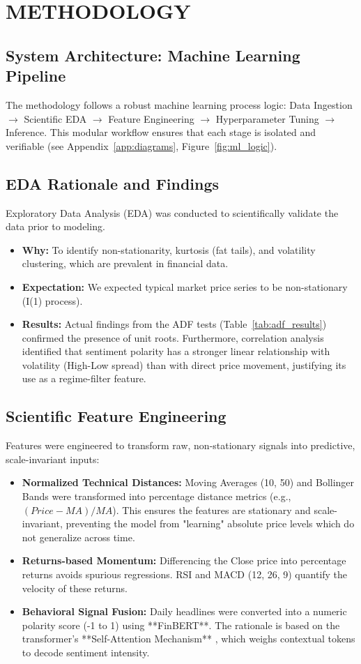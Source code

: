 \chapter{METHODOLOGY}

\section{System Architecture: Machine Learning Pipeline}
The methodology follows a robust machine learning process logic: Data Ingestion $\rightarrow$ Scientific EDA $\rightarrow$ Feature Engineering $\rightarrow$ Hyperparameter Tuning $\rightarrow$ Inference. This modular workflow ensures that each stage is isolated and verifiable (see Appendix~\ref{app:diagrams}, Figure~\ref{fig:ml_logic}).

\section{EDA Rationale and Findings}
Exploratory Data Analysis (EDA) was conducted to scientifically validate the data prior to modeling.
\begin{itemize}
    \item \textbf{Why:} To identify non-stationarity, kurtosis (fat tails), and volatility clustering, which are prevalent in financial data.
    \item \textbf{Expectation:} We expected typical market price series to be non-stationary (I(1) process).
    \item \textbf{Results:} Actual findings from the ADF tests (Table~\ref{tab:adf_results}) confirmed the presence of unit roots. Furthermore, correlation analysis identified that sentiment polarity has a stronger linear relationship with volatility (High-Low spread) than with direct price movement, justifying its use as a regime-filter feature.
\end{itemize}

\section{Scientific Feature Engineering}
Features were engineered to transform raw, non-stationary signals into predictive, scale-invariant inputs:
\begin{itemize}
    \item \textbf{Normalized Technical Distances:} Moving Averages (10, 50) and Bollinger Bands were transformed into percentage distance metrics (e.g., $(Price - MA)/MA$). This ensures the features are stationary and scale-invariant, preventing the model from "learning" absolute price levels which do not generalize across time.
    \item \textbf{Returns-based Momentum:} Differencing the Close price into percentage returns avoids spurious regressions. RSI and MACD (12, 26, 9) quantify the velocity of these returns.
    \item \textbf{Behavioral Signal Fusion:} Daily headlines were converted into a numeric polarity score (-1 to 1) using **FinBERT**. The rationale is based on the transformer's **Self-Attention Mechanism** \citep{vaswani2017}, which weighs contextual tokens to decode sentiment intensity.
\end{itemize}

